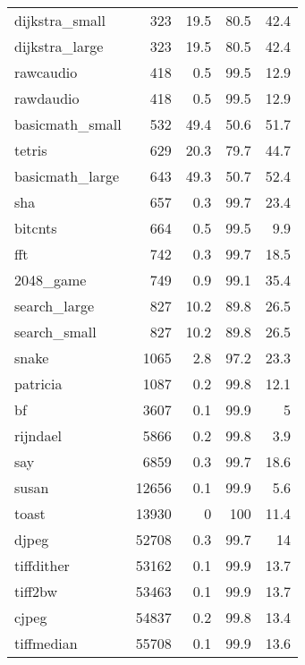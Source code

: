 \begin{tabular}{lrrrr}
 dijkstra\_small  &     323 &   19.5 &         80.5 &    42.4 \\
 dijkstra\_large  &     323 &   19.5 &         80.5 &    42.4 \\
 rawcaudio       &     418 &    0.5 &         99.5 &    12.9 \\
 rawdaudio       &     418 &    0.5 &         99.5 &    12.9 \\
 basicmath\_small &     532 &   49.4 &         50.6 &    51.7 \\
 tetris          &     629 &   20.3 &         79.7 &    44.7 \\
 basicmath\_large &     643 &   49.3 &         50.7 &    52.4 \\
 sha             &     657 &    0.3 &         99.7 &    23.4 \\
 bitcnts         &     664 &    0.5 &         99.5 &     9.9 \\
 fft             &     742 &    0.3 &         99.7 &    18.5 \\
 2048\_game       &     749 &    0.9 &         99.1 &    35.4 \\
 search\_large    &     827 &   10.2 &         89.8 &    26.5 \\
 search\_small    &     827 &   10.2 &         89.8 &    26.5 \\
 snake           &    1065 &    2.8 &         97.2 &    23.3 \\
 patricia        &    1087 &    0.2 &         99.8 &    12.1 \\
 bf              &    3607 &    0.1 &         99.9 &     5   \\
 rijndael        &    5866 &    0.2 &         99.8 &     3.9 \\
 say             &    6859 &    0.3 &         99.7 &    18.6 \\
 susan           &   12656 &    0.1 &         99.9 &     5.6 \\
 toast           &   13930 &    0   &        100   &    11.4 \\
 djpeg           &   52708 &    0.3 &         99.7 &    14   \\
 tiffdither      &   53162 &    0.1 &         99.9 &    13.7 \\
 tiff2bw         &   53463 &    0.1 &         99.9 &    13.7 \\
 cjpeg           &   54837 &    0.2 &         99.8 &    13.4 \\
 tiffmedian      &   55708 &    0.1 &         99.9 &    13.6 \\

\end{tabular}
